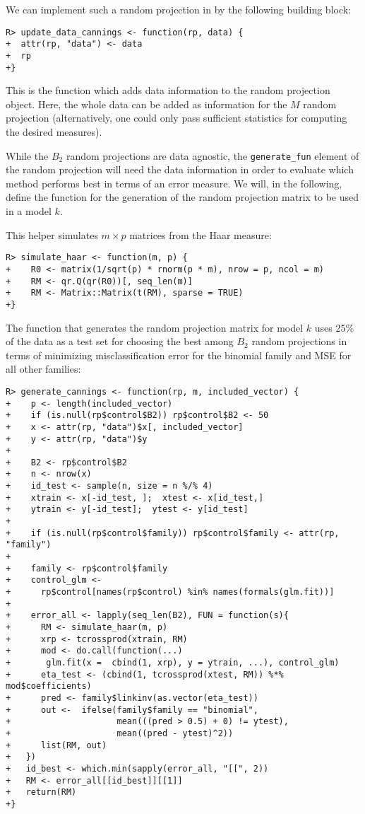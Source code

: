 \documentclass[
  article]{jss}
\begin{document}
We can implement such a random projection in  by the following
building block:

\begin{verbatim}
R> update_data_cannings <- function(rp, data) {
+  attr(rp, "data") <- data
+  rp
+}
\end{verbatim}

This is the function which adds data information to the random
projection object. Here, the whole data can be added as information for
the \(M\) random projection (alternatively, one could only pass
sufficient statistics for computing the desired measures).

While the \(B_2\) random projections are data agnostic, the
\texttt{generate\_fun} element of the random projection will need the
data information in order to evaluate which method performs best in
terms of an error measure. We will, in the following, define the
function for the generation of the random projection matrix to be used
in a model \(k\).

This helper simulates \(m\times p\) matrices from the Haar measure:

\begin{verbatim}
R> simulate_haar <- function(m, p) {
+    R0 <- matrix(1/sqrt(p) * rnorm(p * m), nrow = p, ncol = m)
+    RM <- qr.Q(qr(R0))[, seq_len(m)]
+    RM <- Matrix::Matrix(t(RM), sparse = TRUE)  
+}
\end{verbatim}

The function that generates the random projection matrix for model \(k\)
uses 25\% of the data as a test set for choosing the best among \(B_2\)
random projections in terms of minimizing misclassification error for
the binomial family and MSE for all other families:

\begin{verbatim}
R> generate_cannings <- function(rp, m, included_vector) {
+    p <- length(included_vector)
+    if (is.null(rp$control$B2)) rp$control$B2 <- 50
+    x <- attr(rp, "data")$x[, included_vector]
+    y <- attr(rp, "data")$y
+  
+    B2 <- rp$control$B2
+    n <- nrow(x)
+    id_test <- sample(n, size = n %/% 4)
+    xtrain <- x[-id_test, ];  xtest <- x[id_test,]
+    ytrain <- y[-id_test];  ytest <- y[id_test]
+  
+    if (is.null(rp$control$family)) rp$control$family <- attr(rp, "family")
+  
+    family <- rp$control$family
+    control_glm <-
+      rp$control[names(rp$control) %in% names(formals(glm.fit))]
+
+    error_all <- lapply(seq_len(B2), FUN = function(s){
+      RM <- simulate_haar(m, p)
+      xrp <- tcrossprod(xtrain, RM)
+      mod <- do.call(function(...) 
+       glm.fit(x =  cbind(1, xrp), y = ytrain, ...), control_glm)
+      eta_test <- (cbind(1, tcrossprod(xtest, RM)) %*% mod$coefficients)
+      pred <- family$linkinv(as.vector(eta_test))
+      out <-  ifelse(family$family == "binomial",
+                     mean(((pred > 0.5) + 0) != ytest), 
+                     mean((pred - ytest)^2))
+      list(RM, out)
+   })
+   id_best <- which.min(sapply(error_all, "[[", 2))
+   RM <- error_all[[id_best]][[1]]
+   return(RM)
+}
\end{verbatim}
\end{document}
